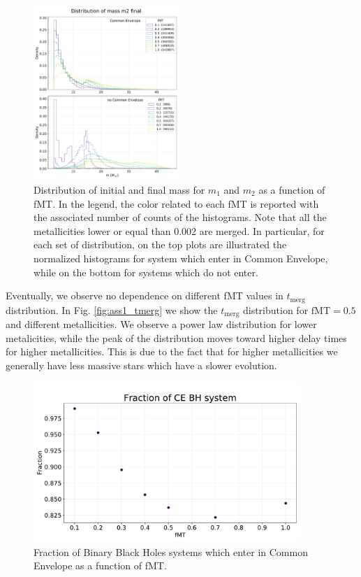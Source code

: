 \documentclass[prb,twocolumn,9pt]{revtex4-1}
\begin{document}
\begin{figure}[htp]
   \hskip 1mm
   \includegraphics[width=0.49\textwidth]{images/assignment2_1/hist_m2_fin_fMT.pdf}
   \vskip 0.3cm
    \caption{Distribution of initial and final mass for \(m_1\) and \(m_2\) as a function of fMT. In the legend, the color related to each  fMT is reported  with the associated number of counts of the histograms. Note that all the metallicities lower or equal than 0.002 are merged. In particular, for each set of distribution, on the top plots are illustrated the normalized histograms for system which enter in Common Envelope, while on the bottom for systems which do not enter.}
    \label{fig:ass2_masses}
\end{figure}



Eventually, we observe no dependence on different fMT values in \(t_\text{merg}\) distribution. In Fig. \ref{fig:ass1_tmerg} we show the \(t_\text{merg}\) distribution for \( \text{fMT} = 0.5\) and different metallicities. We observe a power law distribution for lower metalicities, while the peak of the distribution moves toward higher delay times for higher metallicities. This is due to the fact that for higher metallicities we generally have less massive stars which have a slower evolution.  

\begin{figure}[htp]
    \begin{minipage}[l]{1.0\columnwidth}
    \centering
    \includegraphics[width=0.9\textwidth]{images/assignment2/frac_CE.pdf}
    \caption{Fraction of Binary Black Holes systems which enter in Common Envelope as a function of fMT.}
    \label{fig:ass2_frac_CE}
    \end{minipage}
\end{figure}
\end{document}
